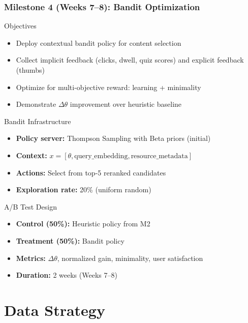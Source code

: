 \documentclass[aspectratio=169]{beamer}
\begin{document}
\begin{frame}
\frametitle{Milestone 4 (Weeks 7--8): Bandit Optimization}
\begin{block}{Objectives}
\begin{itemize}
\item Deploy contextual bandit policy for content selection
\item Collect implicit feedback (clicks, dwell, quiz scores) and explicit feedback (thumbs)
\item Optimize for multi-objective reward: learning + minimality
\item Demonstrate $\Delta\theta$ improvement over heuristic baseline
\end{itemize}
\end{block}

\begin{block}{Bandit Infrastructure}
\begin{itemize}
\item \textbf{Policy server:} Thompson Sampling with Beta priors (initial)
\item \textbf{Context:} $x = [\theta, \text{query\_embedding}, \text{resource\_metadata}]$
\item \textbf{Actions:} Select from top-5 reranked candidates
\item \textbf{Exploration rate:} 20\% (uniform random)
\end{itemize}
\end{block}

\begin{block}{A/B Test Design}
\begin{itemize}
\item \textbf{Control (50\%):} Heuristic policy from M2
\item \textbf{Treatment (50\%):} Bandit policy
\item \textbf{Metrics:} $\Delta\theta$, normalized gain, minimality, user satisfaction
\item \textbf{Duration:} 2 weeks (Weeks 7--8)
\end{itemize}
\end{block}
\end{frame}

\section{Data Strategy}
\end{document}
